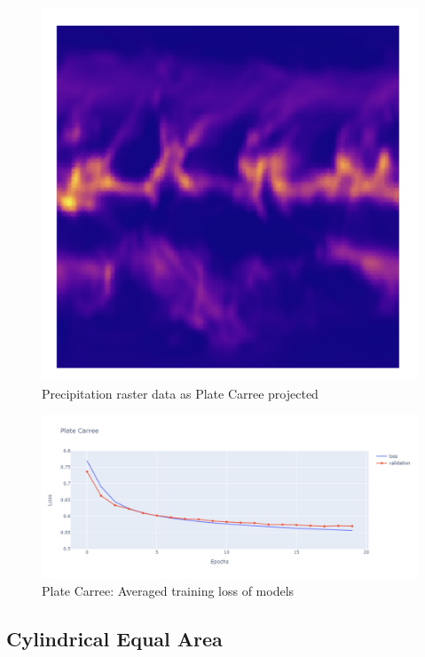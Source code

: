 \begin{figure}[H]
\begin{minipage}{0.30\textwidth}
        \label{fig:eqc_prect_raster}
    \end{minipage}\hfill
    \begin{minipage}{0.30\textwidth}
        \centering
        \includegraphics[width=0.9\linewidth]{figures/chapter-8/plate_caree_prect_raster.png}
        \caption{Precipitation raster data as Plate Carree projected}
        \label{fig:eqc_prect_raster}
    \end{minipage}\hfill
\end{figure}

\begin{figure}[H]
    \centering
    \includegraphics[width=1.0\linewidth]{figures/chapter-8/pc_loss.png}
    \caption{Plate Carree: Averaged training loss of models  }
    \label{fig:pc_loss}
\end{figure}


\subsection{Cylindrical Equal Area}

